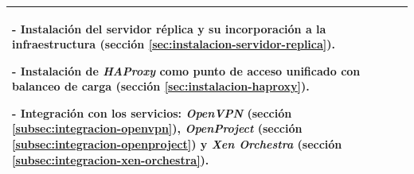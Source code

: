 \begin{table}[htbp]
\begin{tabular}{|>{\raggedright\arraybackslash}p{}|>{\raggedright\arraybackslash}p{}|}
		- \textbf{Instalación del servidor réplica} y su incorporación a la infraestructura (sección \textcolor[HTML]{1B6B93}{\ref{sec:instalacion-servidor-replica}}).\par
		- \textbf{Instalación de \textit{HAProxy}} como punto de acceso unificado con balanceo de carga (sección \textcolor[HTML]{1B6B93}{\ref{sec:instalacion-haproxy}}).\par
		- \textbf{Integración con los servicios}: \textit{OpenVPN} (sección \textcolor[HTML]{1B6B93}{\ref{subsec:integracion-openvpn}}), \textit{OpenProject} (sección \textcolor[HTML]{1B6B93}{\ref{subsec:integracion-openproject}}) y \textit{Xen Orchestra} (sección \textcolor[HTML]{1B6B93}{\ref{subsec:integracion-xen-orchestra}}).                                                                          \\
		\hline
	\end{tabular}
\end{table}

